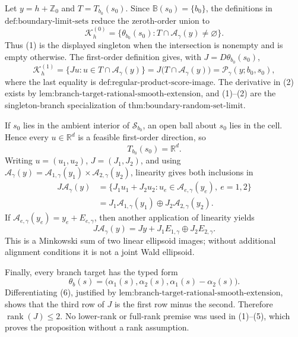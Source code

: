 Let \(y=h+\mathbb Z_0\) and \(T=T_{b_0}(s_0)\). Since \(\mathbb B(s_0)=\{b_0\}\), the definitions in \(\text{def:boundary-limit-sets}\) reduce the zeroth-order union to
\[
 \mathcal K_h^{(0)}
 =\{\theta_{b_0}(s_0):T\cap\mathcal A_\gamma(y)\ne\varnothing\}.
 \tag{1}
\]
Thus (1) is the displayed singleton when the intersection is nonempty and is empty otherwise. The first-order definition gives, with \(J=D\theta_{b_0}(s_0)\),
\[
 \mathcal K_h^{(1)}
 =\{Ju:u\in T\cap\mathcal A_\gamma(y)\}
 =J\bigl(T\cap\mathcal A_\gamma(y)\bigr)
 =\mathcal P_\gamma(y;b_0,s_0),
 \tag{2}
\]
where the last equality is \(\text{def:regular-product-score-image}\). The derivative in (2) exists by \(\text{lem:branch-target-rational-smooth-extension}\), and (1)--(2) are the singleton-branch specialization of \(\text{thm:boundary-random-set-limit}\).

If \(s_0\) lies in the ambient interior of \(\mathcal S_{b_0}\), an open ball about \(s_0\) lies in the cell. Hence every \(u\in\mathbb R^d\) is a feasible first-order direction, so
\[
 T_{b_0}(s_0)=\mathbb R^d.
 \tag{3}
\]
Writing \(u=(u_1,u_2)\), \(J=(J_1,J_2)\), and using \(\mathcal A_\gamma(y)=\mathcal A_{1,\gamma}(y_1)\times\mathcal A_{2,\gamma}(y_2)\), linearity gives both inclusions in
\[
 \begin{aligned}
 J\mathcal A_\gamma(y)
 &=\{J_1u_1+J_2u_2:
       u_e\in\mathcal A_{e,\gamma}(y_e),\ e=1,2\}\\
 &=J_1\mathcal A_{1,\gamma}(y_1)
   \oplus J_2\mathcal A_{2,\gamma}(y_2).
 \end{aligned}
 \tag{4}
\]
If \(\mathcal A_{e,\gamma}(y_e)=y_e+E_{e,\gamma}\), then another application of linearity yields
\[
 J\mathcal A_\gamma(y)
 =Jy+J_1E_{1,\gamma}\oplus J_2E_{2,\gamma}.
 \tag{5}
\]
This is a Minkowski sum of two linear ellipsoid images; without additional alignment conditions it is not a joint Wald ellipsoid.

Finally, every branch target has the typed form
\[
 \theta_b(s)=\bigl(\alpha_1(s),\alpha_2(s),
                    \alpha_1(s)-\alpha_2(s)\bigr).
 \tag{6}
\]
Differentiating (6), justified by \(\text{lem:branch-target-rational-smooth-extension}\), shows that the third row of \(J\) is the first row minus the second. Therefore \(\operatorname{rank}(J)\le2\). No lower-rank or full-rank premise was used in (1)--(5), which proves the proposition without a rank assumption.